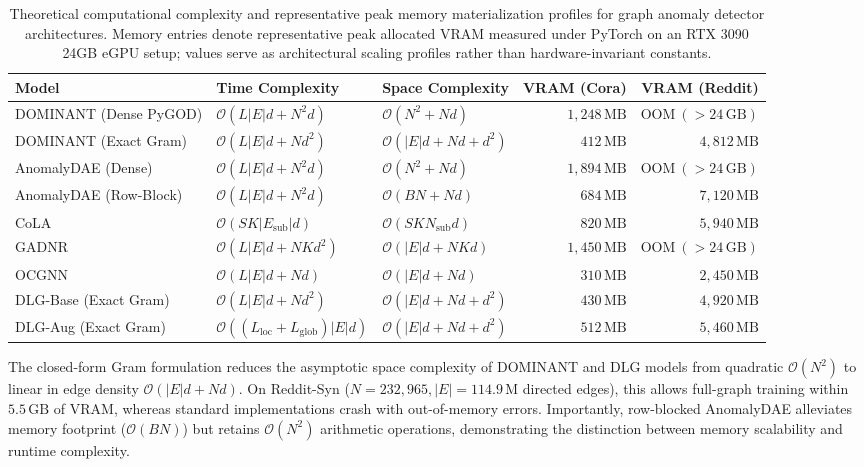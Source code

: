 \documentclass[11pt,a4paper]{article}
\begin{document}
\begin{table}[htbp]
\centering\footnotesize\setlength{\tabcolsep}{3pt}
\caption{Theoretical computational complexity and representative peak memory materialization profiles for graph anomaly detector architectures. Memory entries denote representative peak allocated VRAM measured under PyTorch on an RTX 3090 24GB eGPU setup; values serve as architectural scaling profiles rather than hardware-invariant constants.}
\label{tab:complexity_comparison}
\begin{tabularx}{\textwidth}{lXXrr}\toprule
\textbf{Model} & \textbf{Time Complexity} & \textbf{Space Complexity} & \textbf{VRAM (Cora)} & \textbf{VRAM (Reddit)} \\\midrule
DOMINANT (Dense PyGOD) & $\mathcal{O}(L |E| d + N^2 d)$ & $\mathcal{O}(N^2 + N d)$ & $1,248\,\mathrm{MB}$ & $\mathrm{OOM}\ (>24\,\mathrm{GB})$ \\
DOMINANT (Exact Gram) & $\mathcal{O}(L |E| d + N d^2)$ & $\mathcal{O}(|E| d + N d + d^2)$ & $412\,\mathrm{MB}$ & $4,812\,\mathrm{MB}$ \\
AnomalyDAE (Dense) & $\mathcal{O}(L |E| d + N^2 d)$ & $\mathcal{O}(N^2 + N d)$ & $1,894\,\mathrm{MB}$ & $\mathrm{OOM}\ (>24\,\mathrm{GB})$ \\
AnomalyDAE (Row-Block) & $\mathcal{O}(L |E| d + N^2 d)$ & $\mathcal{O}(B N + N d)$ & $684\,\mathrm{MB}$ & $7,120\,\mathrm{MB}$ \\
CoLA & $\mathcal{O}(S K |E_{\mathrm{sub}}| d)$ & $\mathcal{O}(S K N_{\mathrm{sub}} d)$ & $820\,\mathrm{MB}$ & $5,940\,\mathrm{MB}$ \\
GADNR & $\mathcal{O}(L |E| d + N K d^2)$ & $\mathcal{O}(|E| d + N K d)$ & $1,450\,\mathrm{MB}$ & $\mathrm{OOM}\ (>24\,\mathrm{GB})$ \\
OCGNN & $\mathcal{O}(L |E| d + N d)$ & $\mathcal{O}(|E| d + N d)$ & $310\,\mathrm{MB}$ & $2,450\,\mathrm{MB}$ \\
DLG-Base (Exact Gram) & $\mathcal{O}(L |E| d + N d^2)$ & $\mathcal{O}(|E| d + N d + d^2)$ & $430\,\mathrm{MB}$ & $4,920\,\mathrm{MB}$ \\
DLG-Aug (Exact Gram) & $\mathcal{O}((L_{\mathrm{loc}} + L_{\mathrm{glob}}) |E| d)$ & $\mathcal{O}(|E| d + N d + d^2)$ & $512\,\mathrm{MB}$ & $5,460\,\mathrm{MB}$ \\\bottomrule
\end{tabularx}
\end{table}

The closed-form Gram formulation reduces the asymptotic space complexity of DOMINANT and DLG models from quadratic $\mathcal{O}(N^2)$ to linear in edge density $\mathcal{O}(|E| d + N d)$. On Reddit-Syn ($N=232,965, |E|=114.9\,\mathrm{M}$ directed edges), this allows full-graph training within $5.5\,\mathrm{GB}$ of VRAM, whereas standard implementations crash with out-of-memory errors. Importantly, row-blocked AnomalyDAE alleviates memory footprint ($\mathcal{O}(B N)$) but retains $\mathcal{O}(N^2)$ arithmetic operations, demonstrating the distinction between memory scalability and runtime complexity.
\end{document}
